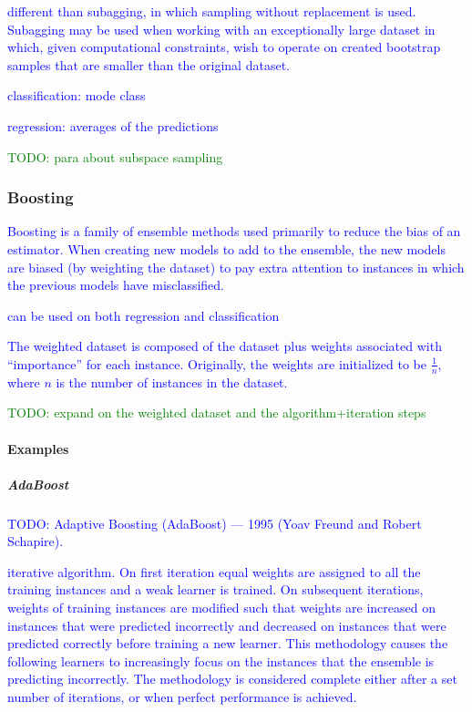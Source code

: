 \textcolor{blue}{different than subagging, in which {sampling without replacement} is used. Subagging may be used when working with an exceptionally large dataset in which, given computational constraints, wish to operate on created bootstrap samples that are smaller than the original dataset.}

\textcolor{blue}{classification: mode class}

\textcolor{blue}{regression: averages of the predictions}

\textcolor{green}{TODO: para about {subspace sampling}}

\subsubsection{Boosting}

\textcolor{blue}{Boosting is a family of ensemble methods used primarily to reduce the bias of an estimator. When creating new models to add to the ensemble, the new models are biased (by weighting the dataset) to pay extra attention to instances in which the previous models have misclassified.}

\textcolor{blue}{can be used on both regression and classification}

\textcolor{blue}{The weighted dataset is composed of the dataset plus weights associated with ``importance'' for each instance. Originally, the weights are initialized to be $\frac{1}{n}$, where $n$ is the number of instances in the dataset.}

\textcolor{green}{TODO: expand on the weighted dataset and the algorithm+iteration steps}

\paragraph{Examples}

\subparagraph{AdaBoost}

\textcolor{blue}{TODO: Adaptive Boosting (AdaBoost) --- 1995 (Yoav Freund and Robert Schapire).}

\textcolor{blue}{iterative algorithm. On first iteration equal weights are assigned to all the training instances and a weak learner is trained. On subsequent iterations, weights of training instances are modified such that weights are increased on instances that were predicted incorrectly and decreased on instances that were predicted correctly before training a new learner. This methodology causes the following learners to increasingly focus on the instances that the ensemble is predicting incorrectly. The methodology is considered complete either after a set number of iterations, or when perfect performance is achieved.}


